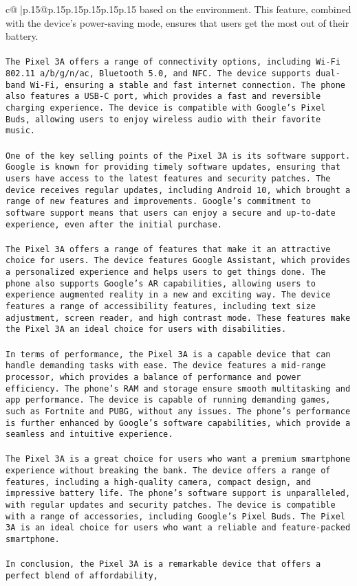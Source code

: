 \documentclass{article}
\begin{document}
{\begin{supertabular}{c@{$\;$}|p{.15\linewidth}@{}p{.15\linewidth}p{.15\linewidth}p{.15\linewidth}p{.15\linewidth}p{.15\linewidth}}
{{{based on the environment. This feature, combined with the device's power-saving mode, ensures that users get the most out of their battery.\\ \tt \\ \tt The Pixel 3A offers a range of connectivity options, including Wi-Fi 802.11 a/b/g/n/ac, Bluetooth 5.0, and NFC. The device supports dual-band Wi-Fi, ensuring a stable and fast internet connection. The phone also features a USB-C port, which provides a fast and reversible charging experience. The device is compatible with Google's Pixel Buds, allowing users to enjoy wireless audio with their favorite music.\\ \tt \\ \tt One of the key selling points of the Pixel 3A is its software support. Google is known for providing timely software updates, ensuring that users have access to the latest features and security patches. The device receives regular updates, including Android 10, which brought a range of new features and improvements. Google's commitment to software support means that users can enjoy a secure and up-to-date experience, even after the initial purchase.\\ \tt \\ \tt The Pixel 3A offers a range of features that make it an attractive choice for users. The device features Google Assistant, which provides a personalized experience and helps users to get things done. The phone also supports Google's AR capabilities, allowing users to experience augmented reality in a new and exciting way. The device features a range of accessibility features, including text size adjustment, screen reader, and high contrast mode. These features make the Pixel 3A an ideal choice for users with disabilities.\\ \tt \\ \tt In terms of performance, the Pixel 3A is a capable device that can handle demanding tasks with ease. The device features a mid-range processor, which provides a balance of performance and power efficiency. The phone's RAM and storage ensure smooth multitasking and app performance. The device is capable of running demanding games, such as Fortnite and PUBG, without any issues. The phone's performance is further enhanced by Google's software capabilities, which provide a seamless and intuitive experience.\\ \tt \\ \tt The Pixel 3A is a great choice for users who want a premium smartphone experience without breaking the bank. The device offers a range of features, including a high-quality camera, compact design, and impressive battery life. The phone's software support is unparalleled, with regular updates and security patches. The device is compatible with a range of accessories, including Google's Pixel Buds. The Pixel 3A is an ideal choice for users who want a reliable and feature-packed smartphone.\\ \tt \\ \tt In conclusion, the Pixel 3A is a remarkable device that offers a perfect blend of affordability, }}}
\end{supertabular}}
\end{document}
